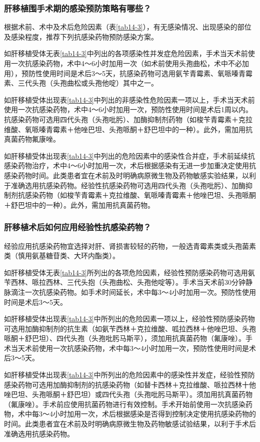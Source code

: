 \subsubsection{肝移植围手术期的感染预防策略有哪些？}

根据术前、术中及术后危险因素（表\ref{tab14-3}），有无感染情况、出现感染的部位及感染程度，推荐下列抗感染药物预防感染方案。

如肝移植受体无表\ref{tab14-3}中列出的各项感染性并发症危险因素，手术当天术前使用一次抗感染药物，术中4～6小时加用一次（如术前使用头孢曲松，术中不必加用），预防性使用时间是术后3～5天，抗感染药物可选用氨苄青霉素、氧哌嗪青霉素、三代头孢（头孢曲松或头孢他啶）其中之一。

如肝移植受体出现表\ref{tab14-3}中列出的非感染性危险因素一项以上，手术当天术前使用一次抗感染药物，术中4～6小时加用一次，预防性使用时间是术后1周以内。抗感染药物可选用四代头孢（头孢吡肟）、加酶抑制剂药物（如梭苄青霉素＋克拉维酸、氧哌嗪青霉素＋他唑巴坦、头孢哌酮＋舒巴坦中的一种）。此外，需加用抗真菌药物氟康唑。

如肝移植受体出现表\ref{tab14-3}中列出的危险因素中的感染性合并症，手术前延续抗感染药物治疗，术中4～6小时加用一次，术后根据感染有无进一步加重决定使用抗感染药物时间。此类患者宜在术前及时明确病原微生物及药物敏感实验结果，以利于准确选用抗感染药物。经验性抗感染药物可选用四代头孢（头孢吡肟）、加酶抑制剂抗感染药物（如梭苄青霉素＋克拉维酸、氧哌嗪青霉素＋他唑巴坦、头孢哌酮＋舒巴坦中的一种）。此外，需加用抗真菌药物。

\subsubsection{肝移植术后如何应用经验性抗感染药物？}

经验应用抗感染药物宜选择对肝、肾损害较轻的药物，一般选青霉素类或头孢菌素类（慎用氨基糖苷类、大环内酯类）。

如肝移植受体无表\ref{tab14-3}所列出的各项危险因素，经验性预防感染药物可选用氨苄西林、哌拉西林、三代头抱（头孢曲松、头孢他啶等）。手术当天术前30分钟静脉滴注一次抗感染药物。如手术时间延长，术中每3～4小时加用一次。预防性使用时间是术后3～5天。

如肝移植受体出现表\ref{tab14-3}中所列出的危险因素一项以上，经验性预防感染药物可选用加酶抑制剂的抗生素（如氨苄西林＋克拉维酸、呱拉西林＋他唑巴坦、头孢哌酮＋舒巴坦）、四代头孢（头孢吡肟马斯平），须加用抗真菌药物（氟康唑）。手术当天术前使用一次抗感染药物，术中每3～4小时加用一次，预防性使用时间是术后3～5天。

如肝移植受体出现表\ref{tab14-3}中所列出的危险因素中的感染性并发症，经验性预防感染药物可选用加酶抑制剂的抗感染药物（如替卡西林＋克拉维酸、哌拉西林十他唑巴坦、头孢哌酮＋舒巴坦）或四代头孢（头孢吡肟马斯平）。须加用抗真菌药物（氟康唑）。手术前应使用抗菌药物进行有效控制。手术开始前使用一次抗感染药物，术中每3～4小时加用一次，术后根据感染是否得到控制决定使用抗感染药物的时间。此类患者宜在术前及时明确病原微生物及药物敏感试验结果，以利于手术后准确选用抗感染药物。

